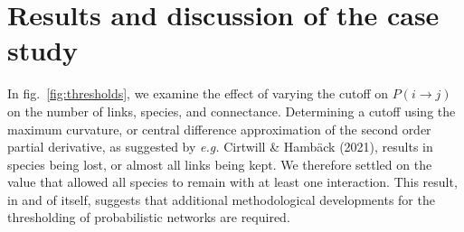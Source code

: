 \documentclass[10pt,oneside]{article}
\begin{document}
\hypertarget{results-and-discussion-of-the-case-study}{%
\section{Results and discussion of the case
study}\label{results-and-discussion-of-the-case-study}}

In fig.~\ref{fig:thresholds}, we examine the effect of varying the
cutoff on \(P(i \rightarrow j)\) on the number of links, species, and
connectance. Determining a cutoff using the maximum curvature, or
central difference approximation of the second order partial derivative,
as suggested by \emph{e.g.} Cirtwill \& Hambäck (2021), results in
species being lost, or almost all links being kept. We therefore settled
on the value that allowed all species to remain with at least one
interaction. This result, in and of itself, suggests that additional
methodological developments for the thresholding of probabilistic
networks are required.
\end{document}
